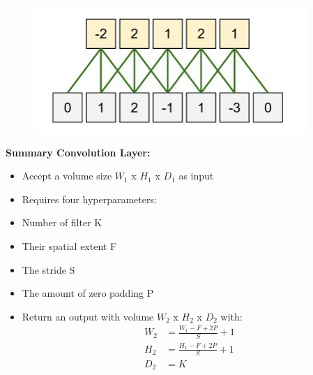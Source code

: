 \begin{center}
  \begin{figure}[H]
  \centering
  \includegraphics[width=1\columnwidth]{images/chap2/Output_volume_WSP.png}
  \label{chap2:Outputvolume_example}
  \end{figure}
\end{center}
\vspace{-1cm}
\textbf{Summary Convolution Layer:}
\begin{itemize}
	\item Accept a volume size $W_{1}$ x $H_{1}$ x $D_{1}$ as input
	\item Requires four hyperparameters:
	\item Number of filter K
	\item Their spatial extent F 
	\item The stride S
	\item The amount of zero padding P
	\item Return an output with volume $W_{2}$ x $H_{2}$ x $D_{2}$ with:
	\begin{align*}
		W_{2} &= \frac{W_{1} - F + 2P }{S} + 1 \\
		H_{2} &= \frac{H_{1} - F + 2P }{S} + 1 \\
		D_{2} &= K
	\end{align*}
\end{itemize}

